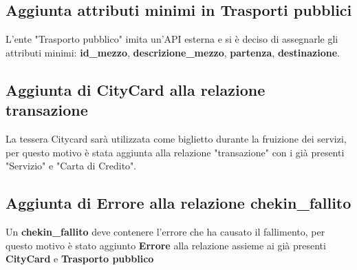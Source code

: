 \subsection{Aggiunta attributi minimi in Trasporti pubblici}
L'ente "Trasporto pubblico" imita un'API esterna e si è deciso di assegnarle gli attributi minimi: \textbf{id{\_}mezzo}, \textbf{descrizione{\_}mezzo}, \textbf{partenza}, \textbf{destinazione}.

\subsection{Aggiunta di \textbf{CityCard} alla relazione \textbf{transazione}}
La tessera Citycard sarà utilizzata come biglietto durante la fruizione dei servizi, per questo motivo è stata aggiunta alla relazione "transazione" con i già presenti "Servizio" e "Carta di Credito".

\subsection{Aggiunta di \textbf{Errore} alla relazione \textbf{chekin{\_}fallito}}
Un \textbf{chekin{\_}fallito} deve contenere l'errore che ha causato il fallimento, per questo motivo è stato aggiunto \textbf{Errore} alla relazione assieme ai già presenti \textbf{CityCard} e \textbf{Trasporto pubblico}